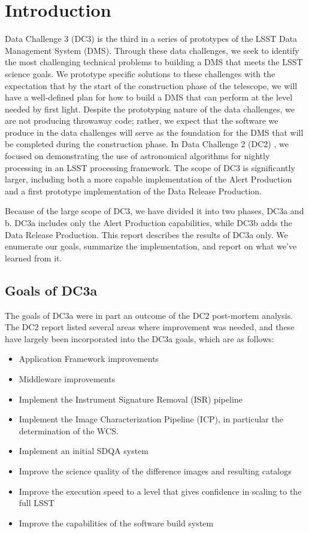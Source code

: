 
\section{Introduction}
Data Challenge 3 (DC3) is the third in a series of prototypes of the LSST Data Management
System (DMS). Through these data challenges, we seek to identify the most challenging technical
problems to building a DMS that meets the LSST science goals. We prototype specific solutions to
these challenges with the expectation that by the start of the construction phase of the telescope,
we will have a well-defined plan for how to build a DMS that can perform at the level needed by
first light. Despite the prototyping nature of the data challenges, we are not producing throwaway
code; rather, we expect that the software we produce in the data challenges will serve as the
foundation for the DMS that will be completed during the construction phase.
In Data Challenge 2 (DC2) \iffalse \ref{DC2report}\fi, we focused on demonstrating the use of
astronomical algorithms for nightly processing in an LSST processing
framework.  The scope of DC3 is significantly larger, including both a
more capable implementation of the Alert Production and a first
prototype implementation of the Data Release Production.

Because of the large scope of DC3, we have divided it into two phases,
DC3a and b.  DC3a includes only the Alert Production capabilities,
while DC3b adds the Data Release Production.  This report describes the results of 
DC3a only. We enumerate our goals, summarize the implementation, and report on what we've learned from it.

\subsection{Goals of DC3a}

The goals of DC3a were in part an outcome of the DC2 post-mortem
analysis.  The DC2 report listed several areas where improvement was
needed, and these have largely been incorporated into the DC3a goals,
which are as follows:

\begin{itemize}
\item Application Framework improvements
\item Middleware improvements
\item Implement the Instrument Signature Removal (ISR) pipeline
\item Implement the Image Characterization Pipeline (ICP), in
  particular the determination of the WCS.
\item Implement an initial SDQA system
\item Improve the science quality of the difference images and
  resulting catalogs
\item Improve the execution speed to a level that gives confidence in
  scaling to the full LSST
\item Improve the capabilities of the software build system
\end{itemize}

